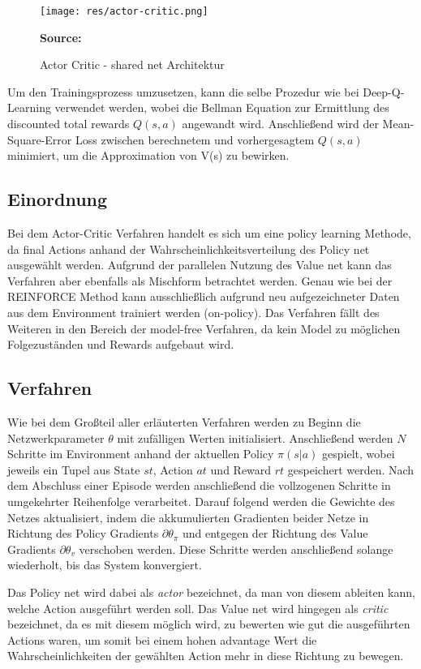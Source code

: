 \documentclass[11pt]{scrartcl}
\newcommand{\source}[1]{\vspace{-5pt} \caption*{\hfill \textbf{Source:} {#1}} }
\begin{document}
\begin{figure}[htp]
\centering
\texttt{[image: res/actor-critic.png]}
\caption{Actor Critic - shared net Architektur}
\source{\cite[~S.268 - Chapter 10 - Figure 5]{L2018}}
\label{fig:actor-critic}
\end{figure}

\newpage
Um den Trainingsprozess umzusetzen, kann die selbe Prozedur wie bei Deep-Q-Learning verwendet werden, wobei
die Bellman Equation zur Ermittlung des discounted total rewards $Q(s,a)$ angewandt wird. Anschließend wird
der Mean-Square-Error Loss zwischen berechnetem und vorhergesagtem $Q(s,a)$ minimiert, um die Approximation
von V(s) zu bewirken.


\subsection{Einordnung}
Bei dem Actor-Critic Verfahren handelt es sich um eine policy learning Methode, da final Actions anhand der
Wahrscheinlichkeitsverteilung des Policy net ausgewählt werden. Aufgrund der parallelen Nutzung des Value
net kann das Verfahren aber ebenfalls als Mischform betrachtet werden. Genau wie bei der REINFORCE Method
kann ausschließlich aufgrund neu aufgezeichneter Daten aus dem Environment trainiert werden (on-policy).
Das Verfahren fällt des Weiteren in den Bereich der model-free Verfahren, da kein Model zu möglichen
Folgezuständen und Rewards aufgebaut wird. 

\subsection{Verfahren}
Wie bei dem Großteil aller erläuterten Verfahren werden zu Beginn die Netzwerkparameter $\theta$ mit
zufälligen Werten initialisiert. Anschließend werden $N$ Schritte im Environment anhand der aktuellen
Policy $\pi(s|a)$ gespielt, wobei jeweils ein Tupel aus State $st$, Action $at$ und Reward $rt$
gespeichert werden. Nach dem Abschluss einer Episode werden anschließend die vollzogenen Schritte in
umgekehrter Reihenfolge verarbeitet. Darauf folgend werden die Gewichte des Netzes aktualisiert, indem
die akkumulierten Gradienten beider Netze in Richtung des Policy Gradients $\partial\theta_\pi$
und entgegen der Richtung des Value Gradients $\partial\theta_v$ verschoben werden. Diese Schritte
werden anschließend solange wiederholt, bis das System konvergiert.

Das Policy net wird dabei als \textit{actor} bezeichnet, da man von diesem ableiten kann, welche
Action ausgeführt werden soll. Das Value net wird hingegen als \textit{critic} bezeichnet, da es mit
diesem möglich wird, zu bewerten wie gut die ausgeführten Actions waren, um somit bei einem hohen
advantage Wert die Wahrscheinlichkeiten der gewählten Action mehr in diese Richtung zu bewegen.
\end{document}
